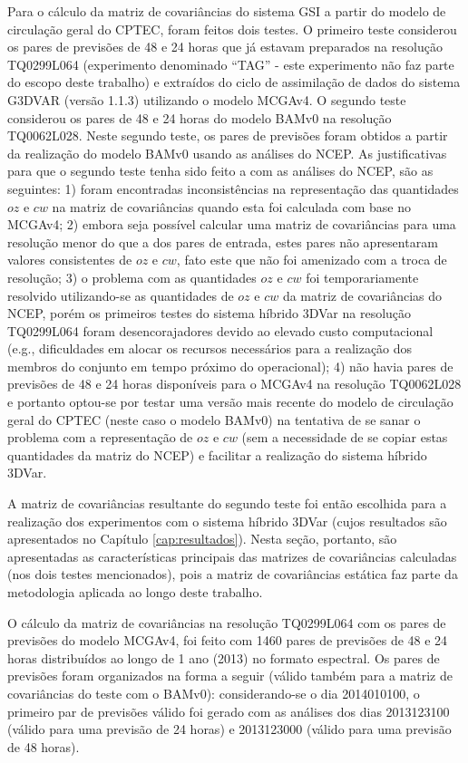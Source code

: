 Para o cálculo da matriz de covariâncias do sistema GSI a partir do modelo de circulação geral do CPTEC, foram feitos dois testes. O primeiro teste considerou os pares de previsões de 48 e 24 horas que já estavam preparados na resolução TQ0299L064 (experimento denominado ``TAG'' - este experimento não faz parte do escopo deste trabalho) e extraídos do ciclo de assimilação de dados do sistema G3DVAR (versão 1.1.3) utilizando o modelo MCGAv4. O segundo teste considerou os pares de 48 e 24 horas do modelo BAMv0 na resolução TQ0062L028. Neste segundo teste, os pares de previsões foram obtidos a partir da realização do modelo BAMv0 usando as análises do NCEP. As justificativas para que o segundo teste tenha sido feito a com as análises do NCEP, são as seguintes: 1) foram encontradas inconsistências na representação das quantidades $oz$ e $cw$ na matriz de covariâncias quando esta foi calculada com base no MCGAv4; 2) embora seja possível calcular uma matriz de covariâncias para uma resolução menor do que a dos pares de entrada, estes pares não apresentaram valores consistentes de $oz$ e $cw$, fato este que não foi amenizado com a troca de resolução; 3) o problema com as quantidades $oz$ e $cw$ foi temporariamente resolvido utilizando-se as quantidades de $oz$ e $cw$ da matriz de covariâncias do NCEP, porém os primeiros testes do sistema híbrido 3DVar na resolução TQ0299L064 foram desencorajadores devido ao elevado custo computacional (e.g., dificuldades em alocar os recursos necessários para a realização dos membros do conjunto em tempo próximo do operacional); 4) não havia pares de previsões de 48 e 24 horas disponíveis para o MCGAv4 na resolução TQ0062L028 e portanto optou-se por testar uma versão mais recente do modelo de circulação geral do CPTEC (neste caso o modelo BAMv0) na tentativa de se sanar o problema com a representação de $oz$ e $cw$ (sem a necessidade de se copiar estas quantidades da matriz do NCEP) e facilitar a realização do sistema híbrido 3DVar. 

A matriz de covariâncias resultante do segundo teste foi então escolhida para a realização dos experimentos com o sistema híbrido 3DVar (cujos resultados são apresentados no Capítulo \ref{cap:resultados}). Nesta seção, portanto, são apresentadas as características principais das matrizes de covariâncias calculadas (nos dois testes mencionados), pois a matriz de covariâncias estática faz parte da metodologia aplicada ao longo deste trabalho.

O cálculo da matriz de covariâncias na resolução TQ0299L064 com os pares de previsões do modelo MCGAv4, foi feito com 1460 pares de previsões de 48 e 24 horas distribuídos ao longo de 1 ano (2013) no formato espectral. Os pares de previsões foram organizados na forma a seguir (válido também para a matriz de covariâncias do teste com o BAMv0): considerando-se o dia 2014010100, o primeiro par de previsões válido foi gerado com as análises dos dias 2013123100 (válido para uma previsão de 24 horas) e 2013123000 (válido para  uma previsão de 48 horas).

